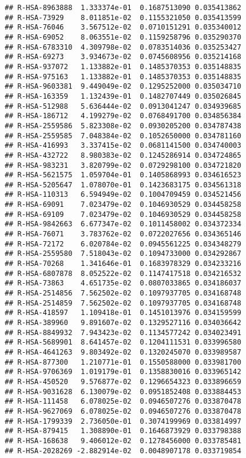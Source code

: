 \documentclass[
]{article}
\begin{document}
\begin{verbatim}
## R-HSA-8963888  1.333374e-01  0.1687513090 0.035413862
## R-HSA-73929    8.011851e-02  0.1155321050 0.035413599
## R-HSA-76046    3.567512e-02  0.0710151291 0.035340012
## R-HSA-69052    8.063551e-02  0.1159258796 0.035290370
## R-HSA-6783310  4.309798e-02  0.0783514036 0.035253427
## R-HSA-69273    3.934673e-02  0.0745608956 0.035214168
## R-HSA-937072   1.133882e-01  0.1485370353 0.035148835
## R-HSA-975163   1.133882e-01  0.1485370353 0.035148835
## R-HSA-9603381  9.449049e-02  0.1295252000 0.035034710
## R-HSA-163359   1.132439e-01  0.1482707449 0.035026845
## R-HSA-512988   5.636444e-02  0.0913041247 0.034939685
## R-HSA-186712   4.199279e-02  0.0768491700 0.034856384
## R-HSA-2559586  5.823308e-02  0.0930205200 0.034787438
## R-HSA-2559585  7.048384e-02  0.1052650000 0.034781160
## R-HSA-416993   3.337415e-02  0.0681141500 0.034740003
## R-HSA-432722   8.980383e-02  0.1245286914 0.034724865
## R-HSA-983231   3.820799e-02  0.0729298100 0.034721820
## R-HSA-5621575  1.059704e-01  0.1405868993 0.034616523
## R-HSA-5205647  1.078070e-01  0.1423683175 0.034561318
## R-HSA-110313   6.594949e-02  0.1004709459 0.034521456
## R-HSA-69091    7.023479e-02  0.1046930529 0.034458258
## R-HSA-69109    7.023479e-02  0.1046930529 0.034458258
## R-HSA-9842663  6.677347e-02  0.1011458002 0.034372334
## R-HSA-76071    3.783762e-02  0.0722027656 0.034365146
## R-HSA-72172    6.020784e-02  0.0945561225 0.034348279
## R-HSA-2559580  7.518043e-02  0.1094733000 0.034292867
## R-HSA-70268    1.341646e-01  0.1683978329 0.034233216
## R-HSA-6807878  8.052522e-02  0.1147417518 0.034216532
## R-HSA-73863    4.651735e-02  0.0807033865 0.034186037
## R-HSA-2514856  7.562502e-02  0.1097937705 0.034168748
## R-HSA-2514859  7.562502e-02  0.1097937705 0.034168748
## R-HSA-418597   1.109418e-01  0.1451013976 0.034159599
## R-HSA-389960   9.891607e-02  0.1329527116 0.034036642
## R-HSA-8849932  7.943423e-02  0.1134577242 0.034023491
## R-HSA-5689901  8.641457e-02  0.1204111531 0.033996580
## R-HSA-4641263  9.803492e-02  0.1320245070 0.033989587
## R-HSA-877300   1.210771e-01  0.1550588000 0.033981700
## R-HSA-9706369  1.019179e-01  0.1358830016 0.033965142
## R-HSA-450520   9.576877e-02  0.1296654323 0.033896659
## R-HSA-9031628  6.130079e-02  0.0951852408 0.033884453
## R-HSA-111458   6.078025e-02  0.0946507276 0.033870478
## R-HSA-9627069  6.078025e-02  0.0946507276 0.033870478
## R-HSA-1799339  2.736050e-01  0.3074199969 0.033814997
## R-HSA-879415   1.308890e-01  0.1646873929 0.033798388
## R-HSA-168638   9.406012e-02  0.1278456000 0.033785481
## R-HSA-2028269 -2.882914e-02  0.0048907178 0.033719854

\end{verbatim}
\end{document}
